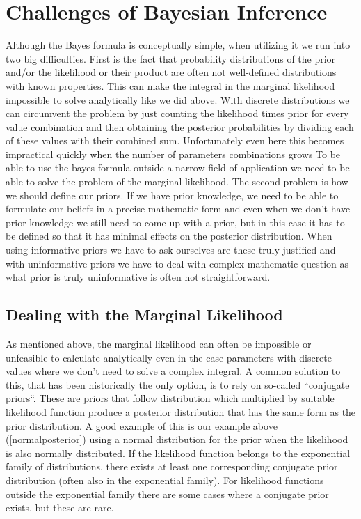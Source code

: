 \documentclass[12pt,a4paper,leqno]{report}
\theoremstyle{plain}
\theoremstyle{definition}
\theoremstyle{remark}
\begin{document}
\section{Challenges of Bayesian Inference}\label{bayesinferencechallenges}

Although the Bayes formula is conceptually simple, when utilizing
it we run into two big difficulties. First is the fact that
probability distributions of the prior and/or the likelihood or their product
are often not well-defined distributions with known properties. This can make the
integral in the marginal likelihood impossible to solve analytically like we did
above. With discrete distributions we can circumvent the problem by just counting the
likelihood times prior for every value combination and then obtaining the posterior
probabilities by dividing each of these values with their combined sum. Unfortunately
even here this becomes impractical quickly when the number of parameters combinations grows
To be able to use the bayes formula outside a narrow field of application we need to be able to solve the
problem of the marginal likelihood. The second problem is how we should define our priors.
If we have prior knowledge, we need to be able to
formulate our beliefs in a precise mathematic form and even when we don't have prior knowledge we still
need to come up with a prior, but in this case it has to be defined so that it has
minimal effects on the posterior distribution. When using informative priors we have to
ask ourselves are these truly justified and with uninformative priors we have to deal
with complex mathematic question as what prior is truly uninformative is often not straightforward.

\subsection{Dealing with the Marginal Likelihood}\label{marginallikehoodproblems}

As mentioned above, the marginal likelihood can often be impossible or
unfeasible to calculate analytically even in the case parameters with discrete
values where we don't need to solve a complex integral. A common solution to this,
that has been historically the only option, is to rely on so-called ``conjugate
priors``. These are priors that follow distribution which multiplied by
suitable likelihood function produce a posterior distribution that has the same
form as the prior distribution. A good example of this is our example above (\ref{normalposterior}) using a normal
distribution for the prior when the likelihood is also normally distributed. If
the likelihood function belongs to the exponential family of distributions, there
exists at least one corresponding conjugate prior distribution (often also in
the exponential family). For likelihood functions outside the exponential family
there are some cases where a conjugate prior exists, but these are rare.
\end{document}
